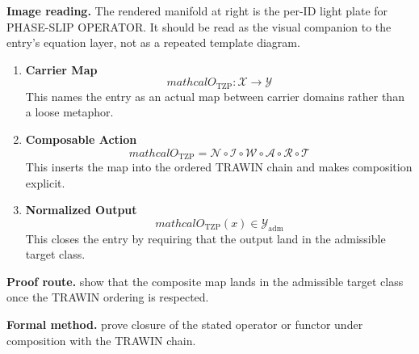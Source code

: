 \begin{samepage}
\noindent\begin{minipage}[t]{0.45\linewidth}
\vspace{0pt}
\raggedright
\scriptsize\textbf{Image reading.} The rendered manifold at right is the per-ID light plate for PHASE-SLIP OPERATOR. It should be read as the visual companion to the entry's equation layer, not as a repeated template diagram.\par
\end{minipage}\hfill
\begin{minipage}[t]{0.53\linewidth}
\vspace*{-0.10in}
\raggedright
{}
\end{minipage}
\end{samepage}

\clearpage


\begin{enumerate}[leftmargin=1.6em,itemsep=9pt,topsep=6pt]
\item \textbf{Carrier Map}
\[
mathcal{O}_{\mathrm{TZP}} : \mathcal{X} \to \mathcal{Y}
\]
This names the entry as an actual map between carrier domains rather than a loose metaphor.

\item \textbf{Composable Action}
\[
mathcal{O}_{\mathrm{TZP}} = \mathcal{N}\circ \mathcal{I}\circ \mathcal{W}\circ \mathcal{A}\circ \mathcal{R}\circ \mathcal{T}
\]
This inserts the map into the ordered TRAWIN chain and makes composition explicit.

\item \textbf{Normalized Output}
\[
mathcal{O}_{\mathrm{TZP}}(x) \in \mathcal{Y}_{\mathrm{adm}}
\]
This closes the entry by requiring that the output land in the admissible target class.
\end{enumerate}

\textbf{Proof route.} show that the composite map lands in the admissible target class once the TRAWIN ordering is respected.

\textbf{Formal method.} prove closure of the stated operator or functor under composition with the TRAWIN chain.

\medskip
{}

